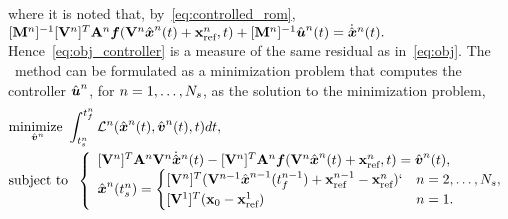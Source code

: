 where it is noted that, by~\eqref{eq:controlled_rom}, $
[\mathbf{M}^{n}]^{-1}[\mathbf {V}^{n}]^T \mathbf{A}^{n} \boldsymbol f(\mathbf {V}^{n} \hat{ \boldsymbol x}^{n}(t) + \mathbf{x}_\text{ref}^{n} ,t) +
[\mathbf{M}^{n}]^{-1}\hat{\boldsymbol u}^{n}(t)  = \dot{\hat{ \boldsymbol x}}^{n}(t).$ 
Hence~\eqref{eq:obj_controller} is a measure of the same residual as in~\eqref{eq:obj}.  The \methodAcronym\ method can be formulated as a minimization problem 
that computes the controller ${\hat{\boldsymbol u}^{n}}$, for $n=1,\ldots,N_s$, as the solution to the minimization problem, 
\begin{equation}\label{eq:tclspg_oc1a} 
\begin{split}
&\underset{\controllerDumArgnt{n} }{\text{minimize } } 
\int_{\timeStartArg{n}}^{\timeEndArg{n}}
\objectiveControlArg{n}(\genstateArg{n}{t},\controllerDumArg{n}{t},t)dt, 
 \\
&\text{subject to } \;  \left\{\begin{array}{l} 
 \basisspaceTArg{n} \stweightingMatArgt{n}{t}
\basisspaceArg{n}  \genstateDotArg{n}{t}  - \basisspaceTArg{n}
\stweightingMatArgt{n}{t} \velocity(\veloargsromn) =\controllerDumArg{n}{t}, \\
 \genstateArg{n}{\timeStartArg{n}} =
\begin{cases} \spatialIC `& n = 2,\ldots,\nslabs,
 \\ \genstateICOne & n=1. \end{cases} \end{array} \right.
\end{split}
\end{equation}
